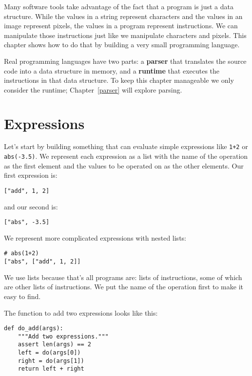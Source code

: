 \documentclass{scrbook}
\newcommand{\chapref}[1]{Chapter~\ref{#1}}
\newcommand{\glossref}[1]{\textbf{#1}}
\begin{document}
Many software tools take advantage of the fact that
a program is just a data structure.
While the values in a string represent characters
and the values in an image represent pixels,
the values in a program represent instructions.
We can manipulate those instructions just like we manipulate characters and pixels.
This chapter shows how to do that
by building a very small programming language.


Real programming languages have two parts:
a \glossref{parser} that translates the source code into a data structure in memory,
and a \glossref{runtime} that executes the instructions in that data structure.
To keep this chapter manageable we only consider the runtime;
\chapref{parser} will explore parsing.

\section{Expressions}\label{interpreter-expressions}


Let's start by building something that can evaluate simple expressions
like \texttt{1+2} or \texttt{abs(-3.5)}.
We represent each expression as a list
with the name of the operation as the first element
and the values to be operated on as the other elements.
Our first expression is:

\begin{lstlisting}[frame=single,frameround=tttt]
["add", 1, 2]
\end{lstlisting}


\noindent and our second is:

\begin{lstlisting}[frame=single,frameround=tttt]
["abs", -3.5]
\end{lstlisting}


We represent more complicated expressions with nested lists:

\begin{lstlisting}[frame=single,frameround=tttt]
# abs(1+2)
["abs", ["add", 1, 2]]
\end{lstlisting}


We use lists because that's all programs are:
lists of instructions,
some of which are other lists of instructions.
We put the name of the operation first to make it easy to find.


The function to add two expressions looks like this:


\begin{lstlisting}[frame=single,frameround=tttt]
def do_add(args):
    """Add two expressions."""
    assert len(args) == 2
    left = do(args[0])
    right = do(args[1])
    return left + right
\end{lstlisting}
\end{document}
